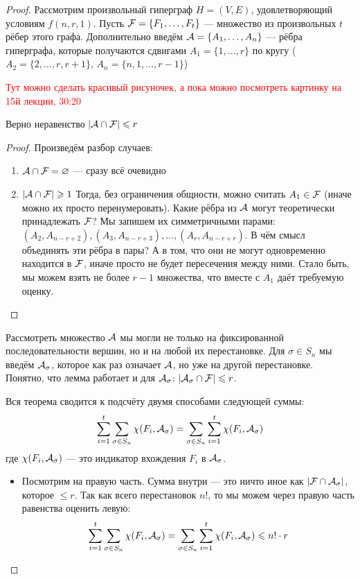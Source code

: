 \begin{proof}
	Рассмотрим произвольный гиперграф $H = (V, E)$, удовлетворяющий условиям $f(n, r, 1)$. Пусть $\mathcal{F} = \{F_1, \ldots, F_t\}$ --- множество из произвольных $t$ рёбер этого графа. Дополнительно введём $\mathcal{A} = \{A_1, \ldots, A_n\}$ --- рёбра гиперграфа, которые получаются сдвигами $A_1 = \{1, \ldots, r\}$ по кругу ($A_2 = \{2, \ldots, r, r + 1\}$, $A_n = \{n, 1, \ldots, r - 1\}$)
	
	\textcolor{red}{Тут можно сделать красивый рисуночек, а пока можно посмотреть картинку на 15й лекции, 30:20}
	
	\begin{lemma}
		Верно неравенство $|\mathcal{A} \cap \mathcal{F}| \leqslant r$
	\end{lemma}

	\begin{proof}
		Произведём разбор случаев:
		\begin{enumerate}
			\item $\mathcal{A} \cap \mathcal{F} = \varnothing$ --- сразу всё очевидно
			
			\item $|\mathcal{A} \cap \mathcal{F}| \geqslant 1$ Тогда, без ограничения общности, можно считать $A_1 \in \mathcal{F}$ (иначе можно их просто перенумеровать). Какие рёбра из $\mathcal{A}$ могут теоретически принадлежать $\mathcal{F}$? Мы запишем их симметричными парами: $(A_2, A_{n - r + 2}), (A_3, A_{n - r + 3}), \ldots, (A_r, A_{n - r + r})$. В чём смысл объединять эти рёбра в пары? А в том, что они не могут одновременно находится в $\mathcal{F}$, иначе просто не будет пересечения между ними. Стало быть, мы можем взять не более $r - 1$ множества, что вместе с $A_1$ даёт требуемую оценку.
		\end{enumerate}
	\end{proof}
	Рассмотреть множество $\mathcal{A}$ мы могли не только на фиксированной последовательности вершин, но и на любой их перестановке. Для $\sigma \in S_n$ мы введём $\mathcal{A}_\sigma$, которое как раз означает $\mathcal{A}$, но уже на другой перестановке. Понятно, что лемма работает и для $\mathcal{A}_\sigma$: $|\mathcal{A}_\sigma \cap \mathcal{F}| \leqslant r$.
	
	Вся теорема сводится к подсчёту двумя способами следующей суммы:
	\[
		\sum_{i = 1}^t \sum_{\sigma \in S_n} \chi(F_i, \mathcal{A}_\sigma) = \sum_{\sigma \in S_n} \sum_{i = 1}^t \chi(F_i, \mathcal{A}_\sigma)
	\]
	где $\chi(F_i, \mathcal{A}_\sigma)$ --- это индикатор вхождения $F_i$ в $\mathcal{A}_\sigma$.
	\begin{itemize}
		\item Посмотрим на правую часть. Сумма внутри --- это ничто иное как $|\mathcal{F} \cap \mathcal{A}_\sigma|$, которое $\le r$. Так как всего перестановок $n!$, то мы можем через правую часть равенства оценить левую:
		\[
			\sum_{i = 1}^t \sum_{\sigma \in S_n} \chi(F_i, \mathcal{A}_\sigma) = \sum_{\sigma \in S_n} \sum_{i = 1}^t \chi(F_i, \mathcal{A}_\sigma) \leqslant n! \cdot r
		\]
		

\end{itemize}
\end{proof}
